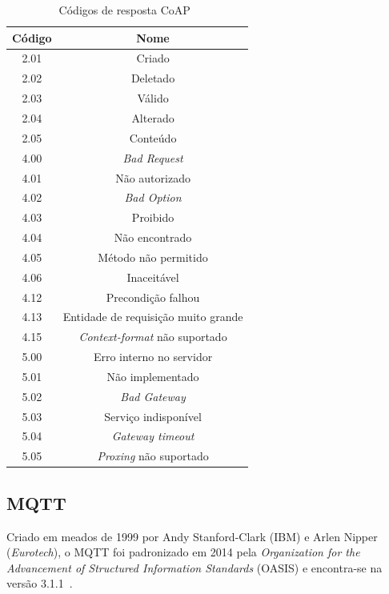 \begin{table}
	\centering\tiny{
	\caption{Códigos de resposta CoAP~\cite{shelby2014constrained}  \label{tab:coap_rep}}
	\begin{tabular}{|c|c|}
		\hline 
		\textbf{Código} & \textbf{Nome} \\ 
		\hline 
		2.01 & Criado \\ 
		\hline 
		2.02 & Deletado \\ 
		\hline 
		2.03 & Válido \\ 
		\hline 
		2.04 & Alterado \\ 
		\hline 
		2.05 & Conteúdo \\ 
		\hline 
		4.00 & \textit{Bad Request} \\ 
		\hline 
		4.01 & Não autorizado \\ 
		\hline 
		4.02 & \textit{Bad Option} \\ 
		\hline 
		4.03 & Proibido \\ 
		\hline 
		4.04 & Não encontrado \\ 
		\hline 
		4.05 & Método não permitido \\ 
		\hline 
		4.06 & Inaceitável \\ 
		\hline 
		4.12 & Precondição falhou \\ 
		\hline 
		4.13 & Entidade de requisição muito grande \\ 
		\hline 
		4.15 & \textit{Context-format} não suportado \\ 
		\hline 
		5.00 & Erro interno no servidor \\ 
		\hline 
		5.01 & Não implementado \\ 
		\hline 
		5.02 & \textit{Bad Gateway} \\ 
		\hline 
		5.03 & Serviço indisponível \\ 
		\hline 
		5.04 & \textit{Gateway timeout} \\ 
		\hline 
		5.05 & \textit{Proxing} não suportado \\ 
		\hline 
	\end{tabular} 
}
\end{table}
 \FloatBarrier
 
\subsection{MQTT}\label{sec:mqtt}

Criado em meados de 1999 por Andy Stanford-Clark (IBM) e Arlen Nipper (\textit{Eurotech}), o MQTT foi padronizado em 2014 pela \textit{Organization for the Advancement of Structured Information Standards} (OASIS) e encontra-se na versão 3.1.1~\cite{mqttv3.1.1}.

